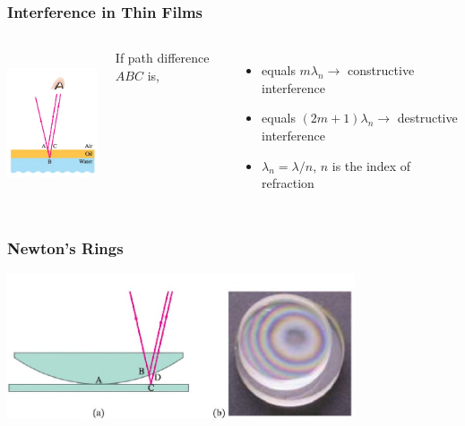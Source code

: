 \documentclass[]{beamer}
\begin{document}
\begin{frame}

\frametitle{Interference in Thin Films}




  \begin{columns}[c]
   \column{2in}  %
  
    \begin{center}
  \includegraphics[height=1.7in]{images5/soap2.jpg}
\end{center}
  
  
   \column{2in}


If path difference $ABC$ is,

\begin{itemize}
\item equals $m\lambda_n\rightarrow$ constructive interference
\pause
\item equals $(2m+1)\lambda_n\rightarrow$ destructive interference
\pause
\item $\lambda_n=\lambda/n$, $n$ is the index of refraction
\end{itemize}


   \end{columns}


  \end{frame}




\begin{frame}

\frametitle{Newton's Rings}


   \begin{center}
  \includegraphics[height=1.7in]{images5/rings.jpg}
\end{center}
  



  \end{frame}
\end{document}
